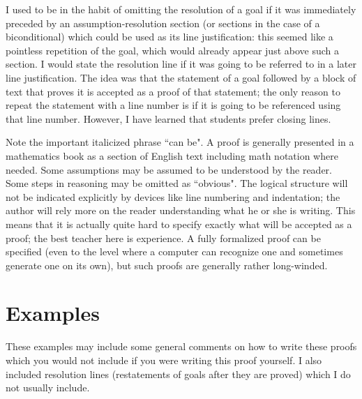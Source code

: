 \documentclass[12pt]{book}
\begin{document}
I used to be in the habit of omitting the resolution of a goal if it was immediately preceded by an assumption-resolution section (or sections in the case of a biconditional) which could be used as its line justification:  this seemed like a pointless repetition of the goal, which would already appear just above such a section.   I would state the resolution line if it was going to be referred to in a later line justification.  The idea was that the statement of a goal followed by a block of text that proves it is accepted as a proof of that statement; the only reason to repeat the statement with a line number is if it is going to be referenced using that line number.  However, I have learned that students prefer closing lines.

Note the important italicized phrase ``can be".  A proof is generally presented in a mathematics book as a section of English text including math notation where needed.  Some assumptions may be assumed to be understood by the reader.  Some steps in reasoning may be omitted as ``obvious".   The logical structure will not be indicated explicitly by devices like line numbering and indentation; the author will rely more on the reader understanding what he or she is writing.  This means that it is actually quite hard to specify exactly what will be accepted as a proof; the best teacher here is experience.  A fully formalized proof can be specified (even to the level where a computer can recognize one and sometimes generate one on its own), but such proofs are generally rather long-winded.

\section{Examples}

These examples may include some general comments on how to write these proofs which you would not include if you were writing this proof yourself.  I also included resolution lines (restatements of goals after they are proved) which I do not usually include.

\newpage
\end{document}
